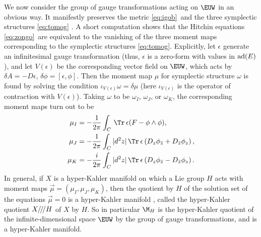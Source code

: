 \par{}

We now consider the group of gauge transformations acting on
$\EUW$ in an obvious way. It manifestly preserves the metric
\eqref{eq:igob}\ and the three symplectic structures \eqref{eq:tomog} . A short
computation shows that the Hitchin equations \eqref{eq:zongo}\ are
equivalent to the vanishing of the three moment maps corresponding
to the symplectic structures \eqref{eq:tomog}. Explicitly, let $\epsilon$
generate an infinitesimal gauge transformation  (thus, $\epsilon$
is a zero-form with values in ${\rm ad}(E)$), and let
$V(\epsilon)$ be the corresponding vector field on $\EUW$, which
acts by $\delta A=-D\epsilon$, $\delta\phi=[\epsilon,\phi]$. Then
the moment map $\mu$ for symplectic structure $\omega$ is found by
solving the condition $\iota_{V(\epsilon)}\omega=\delta\mu$ (here
$\iota_{V(\epsilon)}$ is the operator of contraction with
$V(\epsilon)$). Taking $\omega$ to be $\omega_I$, $\omega_J$, or
$\omega_K$, the corresponding moment maps turn out to be
\setcounter{equation}{10}
\begin{equation}\label{eq:joget}
\begin{aligned}\mu_I & =-{1\over
2\pi}\int_C\,\Tr\,\epsilon(F-\phi\wedge \phi),\\ \mu_J &
=-{1\over 2\pi}\int_C|d^2z|\,\Tr\,\epsilon\left(D_z\phi_{\bar
z}+D_{\bar z}\phi_z\right), \\ \mu_K& = -{i\over
2\pi}\int_C|d^2z|\,\Tr\,\epsilon\left(D_z\phi_{\bar z}-D_{\bar
z}\phi_z\right).\\\end{aligned}
\end{equation}
 In general, if $X$ is a hyper-Kahler
manifold on which a Lie group $H$ acts with moment maps
$\vec\mu=(\mu_I,\mu_J,\mu_K)$, then the quotient by $H$ of the
solution set of the equations $\vec\mu=0$ is a hyper-Kahler
manifold \cite{ref61}, called the hyper-Kahler
quotient $X/\negthinspace/\negthinspace/H$ of $X$ by $H$. So in
particular $\M_H$ is the hyper-Kahler quotient of the
infinite-dimensional space ${\EUW}$ by the group of gauge
transformations, and is a hyper-Kahler manifold.

